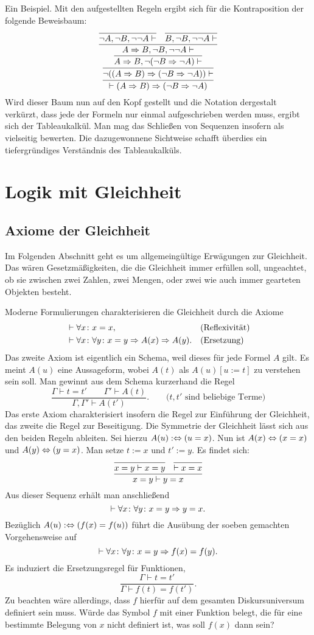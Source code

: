 Ein Beispiel. Mit den aufgestellten Regeln ergibt sich für die
Kontraposition der folgende Beweisbaum:
\[
\infer{\vdash (A\cond B)\cond (\lnot B\cond\lnot A)}{
  \infer{\lnot ((A\cond B)\cond (\lnot B\cond\lnot A))\vdash}{
    \infer{A\cond B, \lnot(\lnot B\cond\lnot A)\vdash}{
      \infer{A\cond B, \lnot B, \lnot\lnot A\vdash }{
        \infer{\lnot A, \lnot B, \lnot\lnot A\vdash}{}
      & \infer{B, \lnot B, \lnot\lnot A\vdash}{}}}}}
\]
Wird dieser Baum nun auf den Kopf gestellt und die Notation dergestalt
verkürzt, dass jede der Formeln nur einmal aufgeschrieben werden
muss, ergibt sich der Tableaukalkül. Man mag das Schließen von
Sequenzen insofern als vielseitig bewerten. Die dazugewonnene Sichtweise
schafft überdies ein tiefergründiges Verständnis des Tableaukalküls.


\newpage
\section{Logik mit Gleichheit}

\subsection{Axiome der Gleichheit}

Im Folgenden Abschnitt geht es um allgemeingültige Erwägungen zur
Gleichheit. Das wären Gesetzmäßigkeiten, die die Gleichheit immer
erfüllen soll, ungeachtet, ob sie zwischen zwei Zahlen, zwei Mengen,
oder zwei wie auch immer gearteten Objekten besteht.

Moderne Formulierungen charakterisieren die Gleichheit durch die Axiome
\begin{align*}
&\vdash\forall x\colon x=x, &&\text{(Reflexivität)}\\
&\vdash\forall x\colon\forall y\colon x=y\Rightarrow A(x)\Rightarrow A(y).
&&\text{(Ersetzung)}
\end{align*}
Das zweite Axiom ist eigentlich ein Schema, weil dieses für jede
Formel $A$ gilt. Es meint $A(u)$ eine Aussageform, wobei $A(t)$ als
$A(u)[u:=t]$ zu verstehen sein soll. Man gewinnt aus dem Schema
kurzerhand die Regel
\[\dfrac{\Gamma\vdash t=t'\qquad\Gamma'\vdash A(t)}
{\Gamma,\Gamma'\vdash A(t')}.\qquad\text{($t,t'$ sind beliebige Terme)}\]
Das erste Axiom charakterisiert insofern die Regel zur Einführung
der Gleichheit, das zweite die Regel zur Beseitigung. Die Symmetrie
der Gleichheit lässt sich aus den beiden Regeln ableiten. Sei hierzu
$A(u):\Leftrightarrow (u=x)$. Nun ist $A(x)\Leftrightarrow (x=x)$ und
$A(y)\Leftrightarrow (y=x)$. Man setze $t:=x$ und $t':=y$. Es findet sich:
\[
\infer{x=y\vdash y=x}{
  \infer{x=y\vdash x=y}{}
& \infer{\vdash x=x}{}}
\]
Aus dieser Sequenz erhält man anschließend
\[\vdash\forall x\colon\forall y\colon x=y\Rightarrow y=x.\]
Bezüglich $A(u):\Leftrightarrow (f(x)=f(u))$ führt die Ausübung der soeben
gemachten Vorgehensweise auf
\[\vdash\forall x\colon\forall y\colon x=y\Rightarrow f(x)=f(y).\]
Es induziert die Ersetzungsregel für Funktionen,
\[\dfrac{\Gamma\vdash t=t'}{\Gamma\vdash f(t)=f(t')}.\]
Zu beachten wäre allerdings, dass $f$ hierfür auf dem gesamten
Diskursuniversum definiert sein muss. Würde das Symbol $f$ mit einer
Funktion belegt, die für eine bestimmte Belegung von $x$ nicht definiert
ist, was soll $f(x)$ dann sein?


